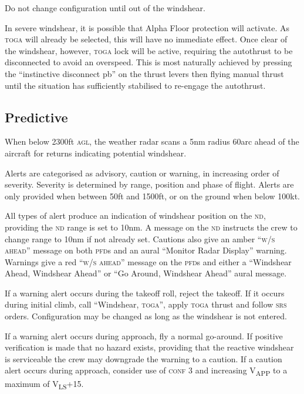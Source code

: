 \documentclass[a5paper,11pt,twoside]{book}
\newcommand{\ac}[1]{{\scshape\MakeLowercase{#1}}}
\newcommand{\inlcite}[1]{{\ac{#1}}}
\newcommand{\multicite}[1]{%
  \nopagebreak
  \noindent{{\color{blue}\footnotesize[\inlcite{#1}]}}
}
\newcommand{\V}[1]{V\textsubscript{#1}}
\begin{document}
Do not change configuration until out of the windshear.

In severe windshear, it is possible that Alpha Floor protection will
activate. As \ac{TOGA} will already be selected, this will have no immediate
effect. Once clear of the windshear, however, \ac{TOGA} lock will be active,
requiring the autothrust to be disconnected to avoid an overspeed. This is most
naturally achieved by pressing the ``instinctive disconnect pb'' on the thrust
levers then flying manual thrust until the situation has sufficiently stabilised
to re-engage the autothrust.

\multicite{FCOM~PRO.AEP.SURV}

\subsection{Predictive}

When below 2300ft \ac{AGL}, the weather radar scans a 5nm radius 60\textdegree{
}arc ahead of the aircraft for returns indicating potential windshear.

Alerts are categorised as advisory, caution or warning, in increasing order of
severity. Severity is determined by range, position and phase of flight. Alerts
are only provided when between 50ft and 1500ft, or on the ground when below
100kt.

All types of alert produce an indication of windshear position on the \ac{ND},
providing the \ac{ND} range is set to 10nm. A message on the \ac{ND} instructs
the crew to change range to 10nm if not already set. Cautions also give an amber
``\ac{W/S AHEAD}'' message on both \ac{PFD}s and an aural ``Monitor Radar
Display'' warning. Warnings give a red ``\ac{W/S AHEAD}'' message on the
\ac{PFD}s and either a ``Windshear Ahead, Windshear Ahead'' or ``Go Around,
Windshear Ahead'' aural message.

If a warning alert occurs during the takeoff roll, reject the takeoff. If it
occurs during initial climb, call ``Windshear, \ac{TOGA}'', apply \ac{TOGA}
thrust and follow \ac{SRS} orders. Configuration may be changed as long as the
windshear is not entered.

If a warning alert occurs during approach, fly a normal go-around. If positive
verification is made that no hazard exists, providing that the reactive
windshear is serviceable the crew may downgrade the warning to a caution. If a
caution alert occurs during approach, consider use of \ac{CONF} 3 and increasing
\V{APP} to a maximum of \V{LS}+15.
\end{document}
